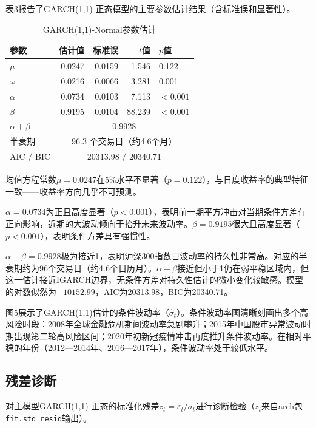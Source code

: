 \documentclass[11pt,a4paper]{article}
\begin{document}
表3报告了GARCH(1,1)-正态模型的主要参数估计结果（含标准误和显著性）。

\begin{table}[ht]
\centering
\caption{GARCH(1,1)-Normal参数估计}
\begin{tabular}{lrrrl}
\toprule
参数 & 估计值 & 标准误 & \(t\)值 & \(p\)值 \\
\midrule
\(\mu\) & 0.0247 & 0.0159 & 1.546 & 0.122 \\
\(\omega\) & 0.0216 & 0.0066 & 3.281 & 0.001 \\
\(\alpha\) & 0.0734 & 0.0103 & 7.113 & \(<0.001\) \\
\(\beta\) & 0.9195 & 0.0104 & 88.239 & \(<0.001\) \\
\midrule
\(\alpha+\beta\) & \multicolumn{4}{c}{0.9928} \\
半衰期 & \multicolumn{4}{c}{96.3 个交易日（约4.6个月）} \\
AIC / BIC & \multicolumn{4}{c}{20313.98 / 20340.71} \\
\bottomrule
\end{tabular}
\end{table}

均值方程常数\(\mu=0.0247\)在5\%水平不显著（\(p=0.122\)），与日度收益率的典型特征一致——收益率方向几乎不可预测。

\(\alpha=0.0734\)为正且高度显著（\(p<0.001\)），表明前一期平方冲击对当期条件方差有正向影响，近期的大波动倾向于抬升未来波动率。\(\beta=0.9195\)很大且高度显著（\(p<0.001\)），表明条件方差具有强惯性。

\(\alpha+\beta=0.9928\)极为接近1，表明沪深300指数日波动率的持久性非常高。对应的半衰期约为96个交易日（约4.6个日历月）。\(\alpha+\beta\)接近但小于1仍在弱平稳区域内，但这一估计接近IGARCH边界，无条件方差对持久性估计的微小变化较敏感。模型的对数似然为$-10152.99$，AIC为20313.98，BIC为20340.71。

图5展示了GARCH(1,1)估计的条件波动率（\(\hat{\sigma}_t\)）。条件波动率图清晰刻画出多个高风险时段：2008年全球金融危机期间波动率急剧攀升；2015年中国股市异常波动时期出现第二轮高风险区间；2020年初新冠疫情冲击再度推升条件波动率。在相对平稳的年份（2012—2014年、2016—2017年），条件波动率处于较低水平。

\subsection{残差诊断}

对主模型GARCH(1,1)-正态的标准化残差\(z_t = \varepsilon_t / \sigma_t\)进行诊断检验（\(z_t\)来自arch包\texttt{fit.std\_resid}输出）。
\end{document}
